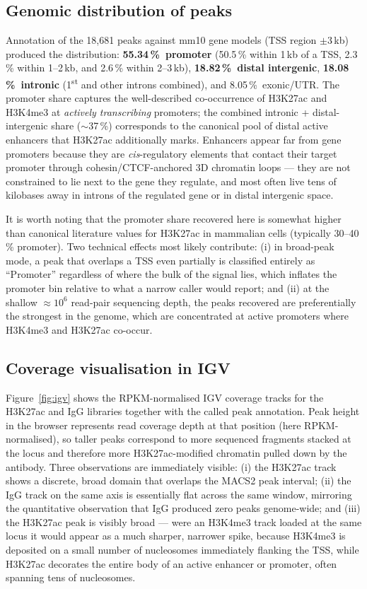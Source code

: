\documentclass[11pt,a4paper]{article}
\begin{document}
\subsection*{Genomic distribution of peaks}
Annotation of the 18{,}681 peaks against mm10 gene models (TSS region $\pm$3\,kb) produced the distribution: \textbf{55.34\,\%~promoter} (50.5\,\% within 1\,kb of a TSS, 2.3\,\% within 1--2\,kb, and 2.6\,\% within 2--3\,kb), \textbf{18.82\,\%~distal intergenic}, \textbf{18.08\,\%~intronic} (1\textsuperscript{st} and other introns combined), and 8.05\,\%~exonic/UTR. The promoter share captures the well-described co-occurrence of H3K27ac and H3K4me3 at \emph{actively transcribing} promoters; the combined intronic + distal-intergenic share ($\sim$37\,\%) corresponds to the canonical pool of distal active enhancers that H3K27ac additionally marks. Enhancers appear far from gene promoters because they are \emph{cis}-regulatory elements that contact their target promoter through cohesin/CTCF-anchored 3D chromatin loops — they are not constrained to lie next to the gene they regulate, and most often live tens of kilobases away in introns of the regulated gene or in distal intergenic space.

It is worth noting that the promoter share recovered here is somewhat higher than canonical literature values for H3K27ac in mammalian cells (typically 30--40\,\% promoter). Two technical effects most likely contribute: (i) in broad-peak mode, a peak that overlaps a TSS even partially is classified entirely as ``Promoter'' regardless of where the bulk of the signal lies, which inflates the promoter bin relative to what a narrow caller would report; and (ii) at the shallow $\approx\!10^{6}$ read-pair sequencing depth, the peaks recovered are preferentially the strongest in the genome, which are concentrated at active promoters where H3K4me3 and H3K27ac co-occur.

\subsection*{Coverage visualisation in IGV}
Figure~\ref{fig:igv} shows the RPKM-normalised IGV coverage tracks for the H3K27ac and IgG libraries together with the called peak annotation. Peak height in the browser represents read coverage depth at that position (here RPKM-normalised), so taller peaks correspond to more sequenced fragments stacked at the locus and therefore more H3K27ac-modified chromatin pulled down by the antibody. Three observations are immediately visible: (i) the H3K27ac track shows a discrete, broad domain that overlaps the MACS2 peak interval; (ii) the IgG track on the same axis is essentially flat across the same window, mirroring the quantitative observation that IgG produced zero peaks genome-wide; and (iii) the H3K27ac peak is visibly broad — were an H3K4me3 track loaded at the same locus it would appear as a much sharper, narrower spike, because H3K4me3 is deposited on a small number of nucleosomes immediately flanking the TSS, while H3K27ac decorates the entire body of an active enhancer or promoter, often spanning tens of nucleosomes.
\end{document}
